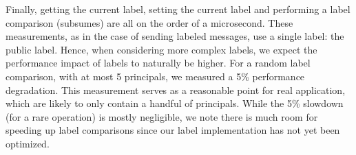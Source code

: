 Finally, getting the current label, setting the current label and
performing a label comparison (subsumes) are all on the order of a
microsecond.
%
These measurements, as in the case of sending labeled messages, use
a single label: the public label.
%
Hence, when considering more complex labels, we expect the performance
impact of labels to naturally be higher.
%
For a random label comparison, with at most 5 principals, we
measured a 5\% performance degradation.
%
This measurement serves as a reasonable point for real application,
which are likely to only contain a handful of principals.
%
While the 5\% slowdown (for a rare operation) is mostly negligible, we
note there is much room for speeding up label comparisons since our
label implementation has not yet been optimized.


